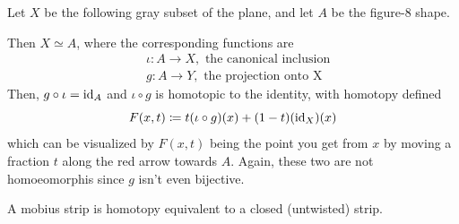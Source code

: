 	\begin{example}[Figure 8]
	  \label{ex:figure-8}
    Let $X$ be the following gray subset of the plane, and let $A$ be the figure-8 shape. 
    \begin{center}
    \end{center}
    Then $X \simeq A$, where the corresponding functions are
    \begin{align}
      & \iota: A \to X, \text{ the canonical inclusion} \\
      & g: A \to Y, \text{ the projection onto X}
    \end{align}
    Then, $g \circ \iota = \operatorname{id}_A$ and $\iota \circ g$ is homotopic to the identity, with homotopy defined
    \begin{equation}
      F(x, t) \coloneqq t (\iota \circ g) (x) + (1 - t) (\operatorname{id}_X) (x)
    \end{equation}
    which can be visualized by $F(x, t)$ being the point you get from $x$ by moving a fraction $t$ along the red arrow towards $A$. Again, these two are not homoeomorphis since $g$ isn't even bijective. 
  \end{example}

	\begin{example}
	  \label{ex:mobius-strip}
    A mobius strip is homotopy equivalent to a closed (untwisted) strip. 
  \end{example}

